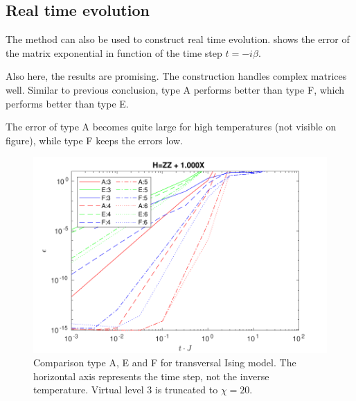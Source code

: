 




\subsection{Real time evolution} \label{subsec_rt_evo}

The method can also be used to construct real time evolution.  shows the error of the matrix exponential in function of the time step $t = -i \beta $.

Also here, the results are promising. The construction handles complex matrices well. Similar to previous conclusion, type A performs better than type F, which performs better than type E.

The error of type A becomes quite large for high temperatures (not visible on figure), while type F keeps the errors low.

\begin{figure}[H]
    \center
    \includegraphics[width=\textwidth]{Figuren/benchmarking/1D_t_ising_time.pdf}
    \caption{Comparison type A, E and F for transversal Ising model. The horizontal axis represents the time step, not the inverse temperature. Virtual level 3 is truncated to $\chi=20$.  }
    \label{fig:benchmark:tising_time}
\end{figure}

